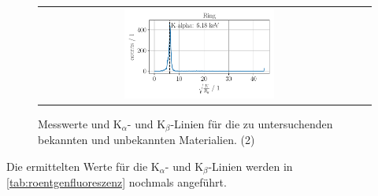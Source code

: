 \documentclass[ngerman]{scrartcl}
\begin{document}
\begin{figure}[H]
\begin{tabular}{cc}
        \includegraphics[width=0.48\textwidth]{../plots/roentgen_data_11.pdf} & \\
    \end{tabular}
    \caption[Messwerte unbekannter Proben (2)]{Messwerte und K$_{\alpha}$- und K$_{\beta}$-Linien für die zu untersuchenden bekannten und unbekannten Materialien. (2)}
    \label{fig:roentgenfluoreszenz2}
\end{figure}
%
Die ermittelten Werte für die K$_{\alpha}$- und K$_{\beta}$-Linien werden in \autoref{tab:roentgenfluoreszenz} nochmals angeführt.
%
\end{document}
